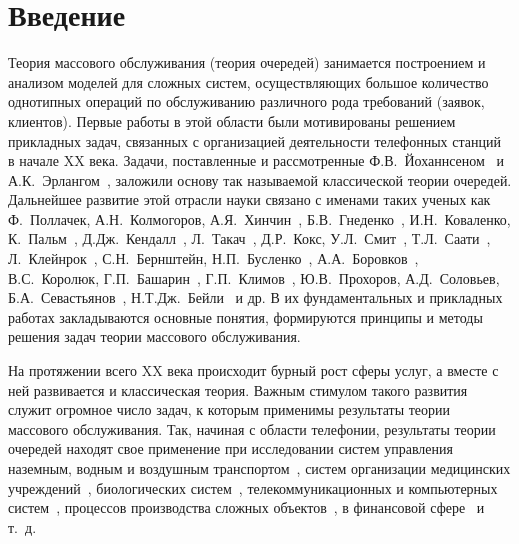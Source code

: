 \chapter*{Введение}							%

\newcommand{\actuality}{{\textbf\actualityTXT}}
\newcommand{\progress}{}
\newcommand{\aim}{{\textbf\aimTXT}}
\newcommand{\tasks}{\textbf{\tasksTXT}}
\newcommand{\novelty}{\textbf{\noveltyTXT}}
\newcommand{\influence}{\textbf{\influenceTXT}}
\newcommand{\methods}{\textbf{\methodsTXT}}
\newcommand{\defpositions}{\textbf{\defpositionsTXT}}
\newcommand{\reliability}{\textbf{\reliabilityTXT}}
\newcommand{\probation}{\textbf{\probationTXT}}
\newcommand{\contribution}{\textbf{\contributionTXT}}
\newcommand{\publications}{\textbf{\publicationsTXT}}

{\actuality} Теория массового обслуживания (теория очередей) занимается построением и анализом моделей для сложных систем, осуществляющих большое количество однотипных операций по обслуживанию различного рода требований (заявок, клиентов). Первые работы в этой области были мотивированы решением прикладных задач, связанных с организацией деятельности телефонных станций в начале XX века. Задачи, поставленные и рассмотренные Ф.В.~Йоханнсеном~\cite{Johannsen} и А.К.~Эрлангом~\cite{Erlang1909,Erlang1917}, заложили основу так называемой классической теории очередей. Дальнейшее развитие этой отрасли науки связано с именами таких ученых как 
Ф.~Поллачек, А.Н.~Колмогоров, А.Я.~Хинчин~\cite{Hinchin}, Б.В.~Гнеденко~\cite{GnedenkoKovalenko}, И.Н.~Коваленко, К.~Пальм~\cite{Palm}, Д.Дж.~Кендалл~\cite{Kendall}, Л.~Такач~\cite{Takacs}, Д.Р.~Кокс, У.Л.~Смит~\cite{KoksSmith}, Т.Л.~Саати~\cite{Saati}, Л.~Клейнрок~\cite{Kleinrok}, С.Н.~Бернштейн, Н.П.~Бусленко~\cite{Buslenko}, А.А.~Боровков~\cite{Borovkov}, В.С.~Королюк, Г.П.~Башарин~\cite{Basharin}, Г.П.~Климов~\cite{Klimov}, Ю.В.~Прохоров, А.Д.~Соловьев,  Б.А.~Севастьянов~\cite{Sevastitanov1969}, Н.Т.Дж.~Бейли~\cite{Bailey1952} и др. В их фундаментальных и прикладных работах закладываются основные понятия, формируются принципы и методы решения задач теории массового обслуживания. 

На протяжении всего XX века происходит бурный рост сферы услуг, а вместе с ней развивается и классическая теория. Важным стимулом такого развития служит огромное число задач, к которым применимы результаты теории массового обслуживания. Так, начиная с области телефонии, результаты теории очередей находят свое применение при исследовании систем управления наземным, водным и воздушным транспортом~\cite{Darroch1964,Helly1964,Haight1964,Gideon1999,Afanasieva2012}, систем организации медицинских учреждений~\cite{Bailey1954,Bailey1957,Flagle1962}, биологических систем~\cite{Kendall1952}, телекоммуникационных и компьютерных систем~\cite{Eisen1962,Vishnevsi2017}, процессов производства сложных объектов~\cite{Brigham1955}, в финансовой сфере~\cite{Albrecher2011} и т.~д.

